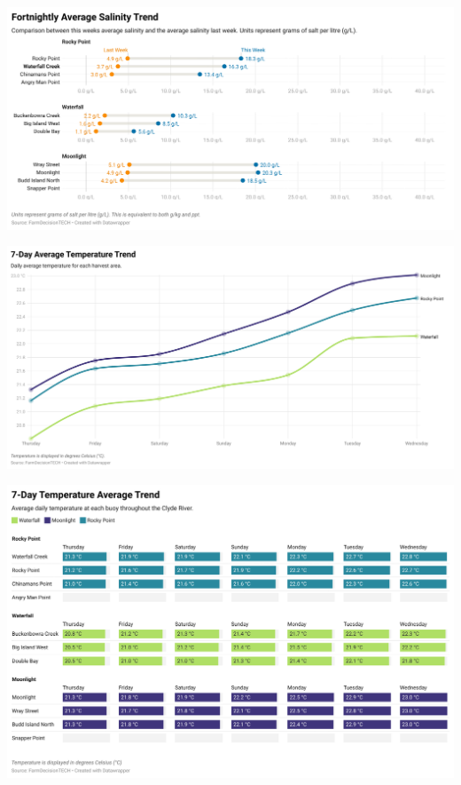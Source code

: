 \documentclass[10pt]{article}
\begin{document}
\begin{SidewaysFigure}
\centering
\includegraphics[width=1.3\textwidth]{fortnightly-salinity.png}
\end{SidewaysFigure}
\vfill
\newpage

\begin{SidewaysFigure}
\centering
\includegraphics[width=1.3\textwidth]{weekly-temperature-chart.png}
\end{SidewaysFigure}
\vfill
\newpage

\begin{SidewaysFigure}
\centering
\includegraphics[width=1.3\textwidth]{weekly-temperature.png}
\end{SidewaysFigure}
\vfill
\newpage
\end{document}
